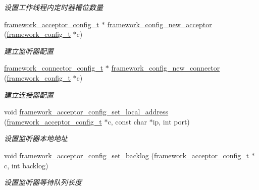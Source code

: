\begin{DoxyCompactItemize}
\begin{DoxyCompactList}\small\item\em 设置工作线程内定时器槽位数量 \end{DoxyCompactList}\item 
\hyperlink{a00051_a61a4e424ff4c86631423dedd97c40064_a61a4e424ff4c86631423dedd97c40064}{framework\+\_\+acceptor\+\_\+config\+\_\+t} $\ast$ \hyperlink{a00104_ga74c94573fba40eb46f9e183fab029978_ga74c94573fba40eb46f9e183fab029978}{framework\+\_\+config\+\_\+new\+\_\+acceptor} (\hyperlink{a00051_a55b26efa9e6ee05514d087ba2593a54b_a55b26efa9e6ee05514d087ba2593a54b}{framework\+\_\+config\+\_\+t} $\ast$c)
\begin{DoxyCompactList}\small\item\em 建立监听器配置 \end{DoxyCompactList}\item 
\hyperlink{a00051_a81253f4c995b97e69be0e67f7a26097f_a81253f4c995b97e69be0e67f7a26097f}{framework\+\_\+connector\+\_\+config\+\_\+t} $\ast$ \hyperlink{a00104_ga4ff6334d19e68c08b5741ee7fed02f81_ga4ff6334d19e68c08b5741ee7fed02f81}{framework\+\_\+config\+\_\+new\+\_\+connector} (\hyperlink{a00051_a55b26efa9e6ee05514d087ba2593a54b_a55b26efa9e6ee05514d087ba2593a54b}{framework\+\_\+config\+\_\+t} $\ast$c)
\begin{DoxyCompactList}\small\item\em 建立连接器配置 \end{DoxyCompactList}\item 
void \hyperlink{a00104_ga5b3c778f37a4c667479d9eae877d3d67_ga5b3c778f37a4c667479d9eae877d3d67}{framework\+\_\+acceptor\+\_\+config\+\_\+set\+\_\+local\+\_\+address} (\hyperlink{a00051_a61a4e424ff4c86631423dedd97c40064_a61a4e424ff4c86631423dedd97c40064}{framework\+\_\+acceptor\+\_\+config\+\_\+t} $\ast$c, const char $\ast$ip, int port)
\begin{DoxyCompactList}\small\item\em 设置监听器本地地址 \end{DoxyCompactList}\item 
void \hyperlink{a00104_gae96d14bcf7b70e8ad52fe614ad848c2c_gae96d14bcf7b70e8ad52fe614ad848c2c}{framework\+\_\+acceptor\+\_\+config\+\_\+set\+\_\+backlog} (\hyperlink{a00051_a61a4e424ff4c86631423dedd97c40064_a61a4e424ff4c86631423dedd97c40064}{framework\+\_\+acceptor\+\_\+config\+\_\+t} $\ast$c, int backlog)
\begin{DoxyCompactList}\small\item\em 设置监听器等待队列长度 \end{DoxyCompactList}\item 

\end{DoxyCompactItemize}
